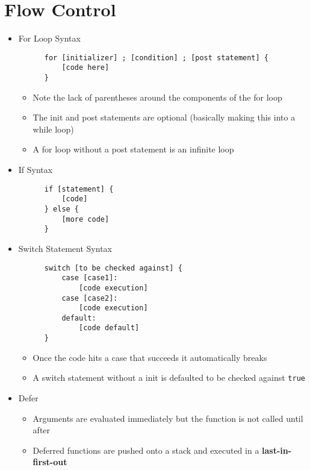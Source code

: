\documentclass[11pt, oneside]{article}   	%
\begin{document}
\section{Flow Control}
  \begin{itemize}
    \item For Loop Syntax
      \begin{verbatim}
      for [initializer] ; [condition] ; [post statement] {
          [code here]
      }
      \end{verbatim}
      \begin{itemize}
        \item Note the lack of parentheses around the components of the for loop
        \item The init and post statements are optional (basically making this into a while loop)
        \item A for loop without a post statement is an infinite loop
      \end{itemize}
    \item If Syntax
      \begin{verbatim}
      if [statement] {
          [code]
      } else {
          [more code]
      }
      \end{verbatim}
    \item Switch Statement Syntax
      \begin{verbatim}
      switch [to be checked against] {
          case [case1]:
              [code execution]
          case [case2]:
              [code execution]
          default:
              [code default]
      }
      \end{verbatim}
      \begin{itemize}
        \item Once the code hits a case that succeeds it automatically breaks
        \item A switch statement without a init is defaulted to be checked against \texttt{true}
      \end{itemize}
    \item Defer
      \begin{itemize}
        \item Arguments are evaluated immediately but the function is not called until after
        \item Deferred functions are pushed onto a stack and executed in a \textbf{last-in-first-out}
      \end{itemize}
  \end{itemize}
\end{document}
